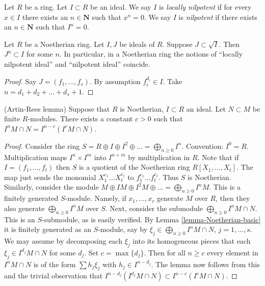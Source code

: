\begin{definition}
\label{definition-locally-nilpotent-ideal}
Let $R$ be a ring. Let $I \subset R$ be an ideal.
We say $I$ is {\it locally nilpotent} if for every
$x \in I$ there exists an $n \in \mathbf{N}$ such
that $x^n = 0$. We say $I$ is {\it nilpotent} if
there exists an $n \in \mathbf{N}$ such that $I^n = 0$.
\end{definition}

\begin{lemma}
\label{lemma-Noetherian-power}
Let $R$ be a Noetherian ring. Let $I, J$ be ideals of $R$.
Suppose $J \subset \sqrt{I}$. Then $J^n \subset I$ for some $n$.
In particular, in a Noetherian ring the notions of
``locally nilpotent ideal''
and ``nilpotent ideal'' coincide.
\end{lemma}

\begin{proof}
Say $J = (f_1,\ldots,f_s)$. 
By assumption $f_i^{d_i} \in I$. 
Take $n = d_1 + d_2 + \ldots + d_s + 1$.
\end{proof}

\begin{lemma}
\label{lemma-Artin-Rees}
(Artin-Rees lemma)
Suppose that $R$ is Noetherian, $I \subset R$ an ideal.
Let $N \subset M$ be finite $R$-modules.
There exists a constant $c > 0$ such that
$I^n M \cap N  =  I^{n-c}(I^cM \cap N)$.
\end{lemma}

\begin{proof}
Consider the ring $S = R \oplus I \oplus I^2 \oplus \ldots
= \bigoplus_{n \geq 0} I^n$. Convention: $I^0 = R$.
Multiplication maps $I^n \times I^m$
into $I^{n+m}$ by multiplication in $R$.
Note that if $I = (f_1, \ldots, f_t)$
then $S$ is a quotient of the Noetherian ring $R[X_1,\ldots,X_t]$.
The map just sends the monomial $X_1^{e_1}\ldots X_t^{e_t}$
to $f_1^{e_1}\ldots f_t^{e_t}$. Thus $S$ is Noetherian. 
Similarly, consider the module $M \oplus IM \oplus I^2M \oplus \ldots
= \bigoplus_{n \geq 0} I^nM$. This is a finitely generated $S$-module.
Namely, if $x_1,\ldots,x_r$ generate $M$ over $R$, then they also generate
$\bigoplus_{n \geq 0} I^nM$ over $S$. Next, consider the
submodule $\bigoplus_{n \geq 0} I^nM \cap N$.
This is an $S$-submodule, as is easily verified. By
Lemma \ref{lemma-Noetherian-basic} it is finitely generated as
an $S$-module,
say by $\xi_j \in \bigoplus_{n \geq 0} I^nM \cap N$, $j = 1,\ldots,s$.
We may assume by decomposing each $\xi_j$ into its homogeneous
pieces that each $\xi_j \in I^{d_j}M \cap N$ for some $d_j$.
Set $c = \max\{d_j\}$. Then for all $n \geq c$ every element
in $I^nM \cap N$ is of the form $\sum h_j \xi_j$ with
$h_j \in I^{n - d_j}$. The lemma now follows from this and the trivial 
observation that $I^{n-d_j}(I^{d_j}M \cap N) \subset I^{n-c}(I^cM \cap N)$.
\end{proof}

